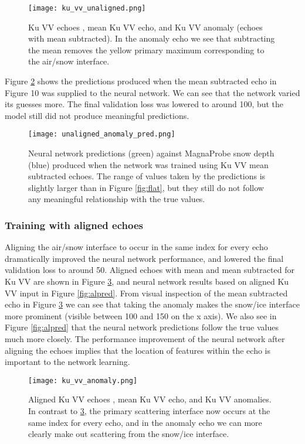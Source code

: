 \documentclass[11pt, a4paper]{article}
\begin{document}
\begin{figure}[H]
   		 \texttt{[image: ku\_vv\_unaligned.png]}
    		\caption{Ku VV echoes , mean Ku VV echo, and Ku VV anomaly (echoes with mean subtracted). In the anomaly echo we see that subtracting the mean removes the yellow primary maximum corresponding to the air/snow interface.}
	\label{fig:unaligned}
\end{figure}

Figure \ref{fig:an} shows the predictions produced when the mean subtracted echo in Figure 10 was supplied to the neural network. We can see that the network varied its guesses more.  The final validation loss was lowered to around 100,  but the model still did not produce meaningful predictions.

\begin{figure}[H]
\centering
   		 \texttt{[image: unaligned\_anomaly\_pred.png]}
    		\caption{Neural network predictions (green) against MagnaProbe snow depth (blue) produced when the network was trained using Ku VV mean subtracted echoes. The range of values taken by the predictions is slightly larger than in Figure \ref{fig:flat}, but they still do not follow any meaningful relationship with the true values.}
	\label{fig:an}
\end{figure}
\pagebreak

\subsubsection{Training with aligned echoes}
Aligning the air/snow interface to occur in the same index for every echo dramatically improved the neural network performance, and lowered the final validation loss to around 50.  Aligned echoes with mean and mean subtracted for Ku VV are shown in Figure \ref{fig:aligned}, and neural network results based on aligned Ku VV input in Figure \ref{fig:alpred}.  From visual inspection of the mean subtracted echo in Figure \ref{fig:aligned} we can see that taking the anomaly makes the snow/ice interface more prominent (visible between 100 and 150 on the x axis). We also see in Figure \ref{fig:alpred} that the neural network predictions follow the true values much more closely.  The performance improvement of the neural network after aligning the echoes implies that the location of features within the echo is important to the network learning. 


\begin{figure}[H]
   		 \texttt{[image: ku\_vv\_anomaly.png]}
    		\caption{Aligned Ku VV echoes , mean Ku VV echo, and Ku VV anomalies. In contrast to \ref{fig:aligned}, the primary scattering interface now occurs at the same index for every echo, and in the anomaly echo we can more clearly make out scattering from the snow/ice interface.}
	\label{fig:aligned}
\end{figure}
\end{document}
